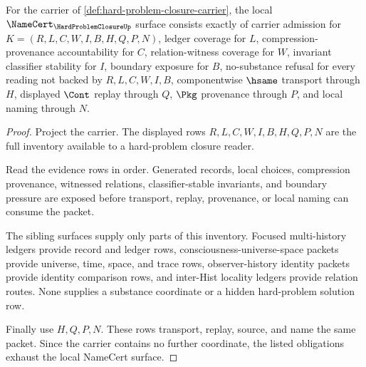 \begin{theorem}
\label{thm:hard-problem-closure-namecert-obligations}
For the carrier of \autoref{def:hard-problem-closure-carrier}, the local $\NameCert_{\HardProblemClosureUp}$ surface consists exactly of carrier admission for $K=(R,L,C,W,I,B,H,Q,P,N)$, ledger coverage for $L$, compression-provenance accountability for $C$, relation-witness coverage for $W$, invariant classifier stability for $I$, boundary exposure for $B$, no-substance refusal for every reading not backed by $R,L,C,W,I,B$, componentwise $\hsame$ transport through $H$, displayed $\Cont$ replay through $Q$, $\Pkg$ provenance through $P$, and local naming through $N$.
\end{theorem}
\begin{proof}
Project the carrier. The displayed rows $R,L,C,W,I,B,H,Q,P,N$ are the full inventory available to a hard-problem closure reader.

Read the evidence rows in order. Generated records, local choices, compression provenance, witnessed relations, classifier-stable invariants, and boundary pressure are exposed before transport, replay, provenance, or local naming can consume the packet.

The sibling surfaces supply only parts of this inventory. Focused multi-history ledgers provide record and ledger rows, consciousness-universe-space packets provide universe, time, space, and trace rows, observer-history identity packets provide identity comparison rows, and inter-Hist locality ledgers provide relation routes. None supplies a substance coordinate or a hidden hard-problem solution row.

Finally use $H,Q,P,N$. These rows transport, replay, source, and name the same packet. Since the carrier contains no further coordinate, the listed obligations exhaust the local NameCert surface.
\end{proof}

